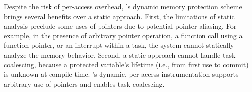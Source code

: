 Despite the risk of per-access overhead, \sys's dynamic memory protection
scheme brings several benefits over a static approach.  First, the limitations
of static analysis preclude some uses of pointers due to potential pointer
aliasing. For example, in the presence of arbitrary pointer operation, a
function call using a function pointer, or an interrupt within a task, the
system cannot statically analyze the memory behavior.   Second, a static approach
cannot handle task coalescing, because a protected variable's lifetime (i.e.,
from first use to commit) is unknown at compile time. \sys's dynamic,
per-access instrumentation supports arbitrary use of pointers and enables task
coalescing.
%


%
%
%
%
%
%
